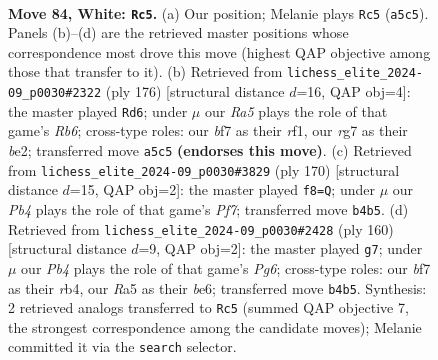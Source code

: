 \documentclass[11pt]{article}
\begin{document}
\clearpage

\begin{figure}[p]\centering
\begin{subfigure}{0.46\textwidth}\centering
\resizebox{\linewidth}{!}{%
\newchessgame
\chessboard[
  setfen={1R6/3k1br1/8/R7/1P1K4/8/8/8 w - - 41 84},
  showmover=false,
  pgfstyle=straightmove, color=movearrow, markmove={a5-c5}
]}
\caption{}
\end{subfigure}\hfill
\begin{subfigure}{0.46\textwidth}\centering
\resizebox{\linewidth}{!}{%
\newchessgame
\chessboard[
  setfen={8/6k1/1R6/P3K3/1B6/8/4b3/5r2 w - - 27 89},
  showmover=false,
  pgfstyle=straightmove, color=movearrow, markmove={b6-d6}
]}
\caption{}
\end{subfigure}
\\[4pt]
\begin{subfigure}{0.46\textwidth}\centering
\resizebox{\linewidth}{!}{%
\newchessgame
\chessboard[
  setfen={4R3/5P2/6K1/3k4/3b4/8/8/8 w - - 9 86},
  showmover=false,
  pgfstyle=straightmove, color=movearrow, markmove={f7-f8}
]}
\caption{}
\end{subfigure}\hfill
\begin{subfigure}{0.46\textwidth}\centering
\resizebox{\linewidth}{!}{%
\newchessgame
\chessboard[
  setfen={8/8/3kb1P1/6R1/1r6/4K3/8/8 w - - 2 81},
  showmover=false,
  pgfstyle=straightmove, color=movearrow, markmove={g6-g7}
]}
\caption{}
\end{subfigure}
\caption{\textbf{Move 84, White: \texttt{Rc5}.} (a) Our position; Melanie plays \texttt{Rc5} (\texttt{a5c5}). Panels (b)--(d) are the retrieved master positions whose correspondence most drove this move (highest QAP objective among those that transfer to it). (b) Retrieved from \texttt{lichess\_elite\_2024-09\_p0030\#2322} (ply 176) [structural distance $d$=16, QAP obj=4]: the master played \texttt{Rd6}; under $\mu$ our \emph{Ra5} plays the role of that game's \emph{Rb6}; cross-type roles: our \emph{b}f7 as their \emph{r}f1, our \emph{r}g7 as their \emph{b}e2; transferred move \texttt{a5c5} \textbf{(endorses this move)}. (c) Retrieved from \texttt{lichess\_elite\_2024-09\_p0030\#3829} (ply 170) [structural distance $d$=15, QAP obj=2]: the master played \texttt{f8=Q}; under $\mu$ our \emph{Pb4} plays the role of that game's \emph{Pf7}; transferred move \texttt{b4b5}. (d) Retrieved from \texttt{lichess\_elite\_2024-09\_p0030\#2428} (ply 160) [structural distance $d$=9, QAP obj=2]: the master played \texttt{g7}; under $\mu$ our \emph{Pb4} plays the role of that game's \emph{Pg6}; cross-type roles: our \emph{b}f7 as their \emph{r}b4, our \emph{R}a5 as their \emph{b}e6; transferred move \texttt{b4b5}. Synthesis: 2 retrieved analogs transferred to \texttt{Rc5} (summed QAP objective 7, the strongest correspondence among the candidate moves); Melanie committed it via the \texttt{search} selector.}
\label{fig:thought-m166}
\end{figure}
\end{document}
